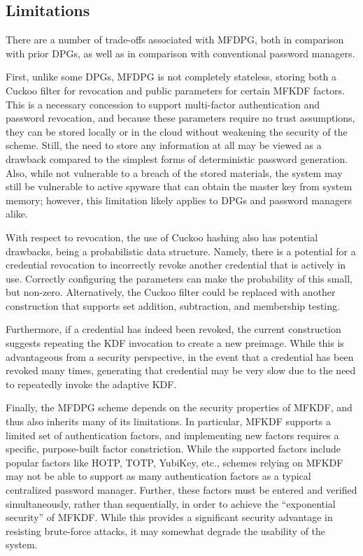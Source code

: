 \subsection{Limitations}

There are a number of trade-offs associated with MFDPG, both in comparison with prior DPGs, as well as in comparison with conventional password managers.

First, unlike some DPGs, MFDPG is not completely stateless, storing both a Cuckoo filter for revocation and public parameters for certain MFKDF factors. This is a necessary concession to support multi-factor authentication and password revocation, and because these parameters require no trust assumptions, they can be stored locally or in the cloud without weakening the security of the scheme. Still, the need to store any information at all may be viewed as a drawback compared to the simplest forms of deterministic password generation.
Also, while not vulnerable to a breach of the stored materials, the system may still be vulnerable to active spyware that can obtain the master key from system memory; however, this limitation likely applies to DPGs and password managers alike.

With respect to revocation, the use of Cuckoo hashing also has potential drawbacks, being a probabilistic data structure. Namely, there is a potential for a credential revocation to incorrectly revoke another credential that is actively in use. Correctly configuring the parameters can make the probability of this small, but non-zero. Alternatively, the Cuckoo filter could be replaced with another construction that supports set addition, subtraction, and membership testing.

Furthermore, if a credential has indeed been revoked, the current construction suggests repeating the KDF invocation to create a new preimage. While this is advantageous from a security perspective, in the event that a credential has been revoked many times, generating that credential may be very slow due to the need to repeatedly invoke the adaptive KDF.

Finally, the MFDPG scheme depends on the security properties of MFKDF, and thus also inherits many of its limitations. In particular, MFKDF supports a limited set of authentication factors, and implementing new factors requires a specific, purpose-built factor constriction. While the supported factors include popular factors like HOTP, TOTP, YubiKey, etc., schemes relying on MFKDF may not be able to support as many authentication factors as a typical centralized password manager.
Further, these factors must be entered and verified simultaneously, rather than sequentially, in order to achieve the ``exponential security'' of MFKDF. While this provides a significant security advantage in resisting brute-force attacks, it may somewhat degrade the usability of the system.

